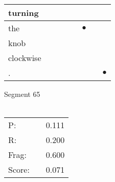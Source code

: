 \documentclass[landscape]{article}
\newcommand{\ssp}{\hspace{2pt}}
\newcommand{\mex}{\cellcolor{g}$\bullet$}
\begin{document}
\begin{tabular}{|l|p{10pt}|p{10pt}|p{10pt}|p{10pt}|p{10pt}|p{10pt}|p{10pt}|}
\hline
\ssp turning \ssp&\hspace{2pt}&\hspace{2pt}&\hspace{2pt}&\hspace{2pt}&\hspace{2pt}&\hspace{2pt}&\hspace{2pt}\\
\hline
\ssp \cellcolor{ref4}the \ssp&\hspace{2pt}&\hspace{2pt}&\hspace{2pt}&\hspace{2pt}&\hspace{2pt}\mex&\hspace{2pt}&\hspace{2pt}\\
\hline
\ssp knob \ssp&\hspace{2pt}&\hspace{2pt}&\hspace{2pt}&\hspace{2pt}&\hspace{2pt}&\hspace{2pt}&\hspace{2pt}\\
\hline
\ssp clockwise \ssp&\hspace{2pt}&\hspace{2pt}&\hspace{2pt}&\hspace{2pt}&\hspace{2pt}&\hspace{2pt}&\hspace{2pt}\\
\hline
\ssp \cellcolor{ref6}. \ssp&\hspace{2pt}&\hspace{2pt}&\hspace{2pt}&\hspace{2pt}&\hspace{2pt}&\hspace{2pt}&\hspace{2pt}\mex\\
\hline
\end{tabular}

\vspace{6pt}
\noindent Segment 65\\\\
\noindent\begin{tabular}{lm{12pt}r}
\hline
P:&&0.111\\
R:&&0.200\\
Frag:&&0.600\\
Score:&&0.071\\
\end{tabular}
\end{document}
